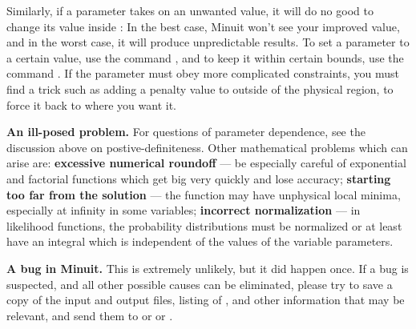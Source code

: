 \begin{UL}
      Similarly, if a parameter takes on an unwanted value, it will do no good
      to change its value inside : In the best case, 
      Minuit won't see your
      improved value, and in the worst case, it will produce unpredictable
      results. To set a parameter to a certain value, use the command
      , and to keep it within certain bounds, use the command
      .  If the parameter must obey more complicated constraints,
      you must find a trick such as adding a penalty value to  outside
      of the physical region, to force it back to where you want it.
\item {\bf An ill-posed problem.}
      For questions of parameter dependence, see the discussion above
      on postive-definiteness.
      Other mathematical problems which can arise are:
      {\bf excessive numerical roundoff} ---
      be especially careful of exponential and factorial functions
      which get big very quickly and lose accuracy;
      {\bf starting too far from the solution} ---
      the function may have unphysical local minima, especially
      at infinity in some variables;
      {\bf incorrect normalization} ---
      in likelihood functions, the probability distributions must
      be normalized or at least have an integral which is independent
      of the values of the variable parameters.
\item {\bf A bug in Minuit.}
      This is extremely unlikely, but it did happen once. If a bug is suspected, and
      all other possible causes can be eliminated, please try to save a copy of the
      input and output files, listing of , and other information that may be
      relevant, and send them to  or  or
      .
\end{UL}
